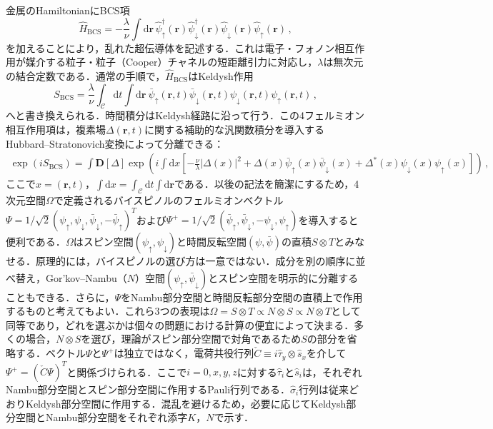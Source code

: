 \documentclass[a4paper,11pt]{ltjsarticle}
\def\d{\mathrm{d}}
\def\D{\mathbf{D}}
\def\rt{(\mathbf{r},t)}
\begin{document}
金属のHamiltonianにBCS項
$$\hat{H}_{\mathrm{BCS}}=-\frac{\lambda}{\nu}\int\d\mathbf{r}\,\hat{\psi}^{\dag}_{\uparrow}(\mathbf{r})
\hat{\psi}^{\dag}_{\downarrow}(\mathbf{r})
\hat{\psi}_{\downarrow}(\mathbf{r})
\hat{\psi}_{\uparrow}(\mathbf{r})\,,$$
を加えることにより，乱れた超伝導体を記述する．これは電子・フォノン相互作用が媒介する粒子・粒子（Cooper）チャネルの短距離引力に対応し，$\lambda$は無次元の結合定数である．通常の手順で，$\hat{H}_{\mathrm{BCS}}$はKeldysh作用
$$S_{\mathrm{BCS}}=\frac{\lambda}{\nu}\int_{\mathcal{C}}\d
t\int\d\mathbf{r}\ \bar{\psi}_{\uparrow}\rt
\bar{\psi}_{\downarrow}\rt\psi_{\downarrow}\rt\psi_{\uparrow}\rt\,,$$
へと書き換えられる．時間積分はKeldysh経路に沿って行う．この4フェルミオン相互作用項は，複素場$\Delta\rt$に関する補助的な汎関数積分を導入するHubbard--Stratonovich変換によって分離できる：
\begin{eqnarray}\label{SuperCond-BCS-HS}
\exp(iS_{\mathrm{BCS}})=\int\D[\Delta]\exp\left(i\int\d
x\left[-\frac{\nu}{\lambda}|\Delta(x)|^{2}+\Delta(x)
\bar{\psi}_{\uparrow}(x)\bar{\psi}_{\downarrow}(x)+
\Delta^{*}(x)\psi_{\downarrow}(x)\psi_{\uparrow}(x)\right]\right)\,,
\end{eqnarray}
ここで$x=\rt$，$\int\d x=\int_{\mathcal{C}}\d t\int\d\mathbf{r}$である．以後の記法を簡潔にするため，4次元空間$\Omega$で定義されるバイスピノルのフェルミオンベクトル$\Psi=1/\sqrt{2}(\psi_{\uparrow},\psi_{\downarrow},\bar{\psi}_{\downarrow},-\bar{\psi}_{\uparrow})^{T}$および$\Psi^{+}=1/\sqrt{2}(\bar{\psi}_{\uparrow},\bar{\psi}_{\downarrow},-\psi_{\downarrow},\psi_{\uparrow})$を導入すると便利である．$\Omega$はスピン空間$(\psi_{\uparrow},\psi_{\downarrow})$と時間反転空間$(\psi,\bar{\psi})$の直積$S\otimes T$とみなせる．原理的には，バイスピノルの選び方は一意ではない．成分を別の順序に並べ替え，Gor'kov--Nambu\cite{Gor'kov,Nambu:1960tm}（$N$）空間$(\psi_{\uparrow},\bar{\psi}_{\downarrow})$とスピン空間を明示的に分離することもできる．さらに，$\Psi$をNambu部分空間と時間反転部分空間の直積上で作用するものと考えてもよい．これら3つの表現は$\Omega=S\otimes T\propto N\otimes S\propto N\otimes T$として同等であり，どれを選ぶかは個々の問題における計算の便宜によって決まる．多くの場合，$N\otimes S$を選び，理論がスピン部分空間で対角であるため$S$の部分を省略する．ベクトル$\Psi$と$\Psi^{+}$は独立ではなく，電荷共役行列$\check{C}\equiv i\hat{\tau}_{y}\otimes\hat{s}_{x}$を介して$\Psi^{+}=(\check{C}\Psi)^{T}$と関係づけられる．ここで$i=0,x,y,z$に対する$\hat{\tau}_{i}$と$\hat{s}_{i}$は，それぞれNambu部分空間とスピン部分空間に作用するPauli行列である．$\hat\sigma_i$行列は従来どおりKeldysh部分空間に作用する．混乱を避けるため，必要に応じてKeldysh部分空間とNambu部分空間をそれぞれ添字$K$，$N$で示す．
\end{document}
